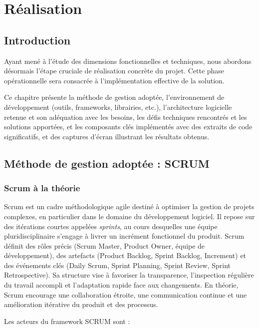 \documentclass[12pt,a4paper]{report}
\begin{document}
	\chapter{Réalisation}
	
	\section{Introduction}
	
	Ayant mené à l'étude des dimensions fonctionnelles et techniques, nous abordons désormais l'étape cruciale de réalisation concrète du projet. Cette phase opérationnelle sera consacrée à l'implémentation effective de la solution.
	
	Ce chapitre présente la méthode de gestion adoptée, l'environnement de développement (outils, frameworks, librairies, etc.), l'architecture logicielle retenue et son adéquation avec les besoins, les défis techniques rencontrés et les solutions apportées, et les composants clés implémentés avec des extraits de code significatifs, et des captures d'écran illustrant les résultats obtenus.
	
	\section{Méthode de gestion adoptée : SCRUM}
	
	\subsection{Scrum à la théorie}
	
	Scrum est un cadre méthodologique agile destiné à optimiser la gestion de projets complexes, en particulier dans le domaine du développement logiciel. Il repose sur des itérations courtes appelées \textit{sprints}, au cours desquelles une équipe pluridisciplinaire s'engage à livrer un incrément fonctionnel du produit. Scrum définit des rôles précis (Scrum Master, Product Owner, équipe de développement), des artefacts (Product Backlog, Sprint Backlog, Increment) et des événements clés (Daily Scrum, Sprint Planning, Sprint Review, Sprint Retrospective). Sa structure vise à favoriser la transparence, l’inspection régulière du travail accompli et l’adaptation rapide face aux changements. En théorie, Scrum encourage une collaboration étroite, une communication continue et une amélioration itérative du produit et des processus.
	
	Les acteurs du framework SCRUM sont :
	
\end{document}
